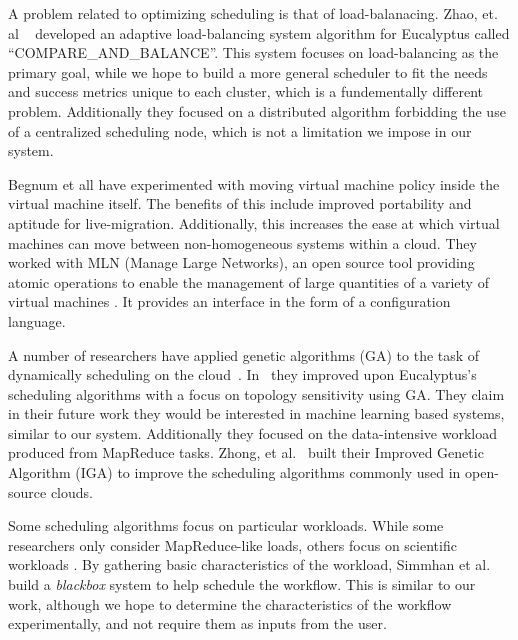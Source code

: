 A problem related to optimizing scheduling is that of load-balanacing.  Zhao,
et. al ~\cite{Zhao} developed an adaptive load-balancing system algorithm for
Eucalyptus called ``COMPARE\_AND\_BALANCE''.  This system focuses on
load-balancing as the primary goal, while we hope to build a more general
scheduler to fit the needs and success metrics unique to each cluster, which is
a fundementally different problem.  Additionally they focused on a distributed
algorithm forbidding the use of a centralized scheduling node, which is not a
limitation we impose in our system.


Begnum et all \cite{Begnum} have experimented with moving virtual machine policy
inside the virtual machine itself.  The benefits of this include improved
portability and aptitude for live-migration.  Additionally, this increases the
ease at which virtual machines can move between non-homogeneous systems within a
cloud.  They worked with MLN (Manage Large Networks), an open source tool
providing atomic operations to enable the management of large quantities of a
variety of virtual machines \cite{Xen,UML,VMware}.  It provides an interface in
the form of a configuration language.


A number of researchers have applied genetic algorithms (GA) to the task of
dynamically scheduling on the cloud~\cite{Lee,Zhong,Chenhong}.  In~\cite{Lee}
they improved upon Eucalyptus's scheduling algorithms with a focus on topology
sensitivity using GA.  They claim in their future work they would be interested
in machine learning based systems, similar to our system.  Additionally they
focused on the data-intensive workload produced from MapReduce tasks. Zhong, et
al.~\cite{Zhong} built their Improved Genetic Algorithm (IGA) to improve the
scheduling algorithms commonly used in open-source clouds.



Some scheduling algorithms focus on particular workloads.  While some
researchers only consider MapReduce-like loads, others focus on scientific
workloads \cite{Juve,Simmhan,Hoffa}.  By gathering basic characteristics of the
workload, Simmhan et al.~\cite{Simmhan} build a \emph{blackbox} system to help
schedule the workflow.  This is similar to our work, although we hope to
determine the characteristics of the workflow experimentally, and not require
them as inputs from the user.
